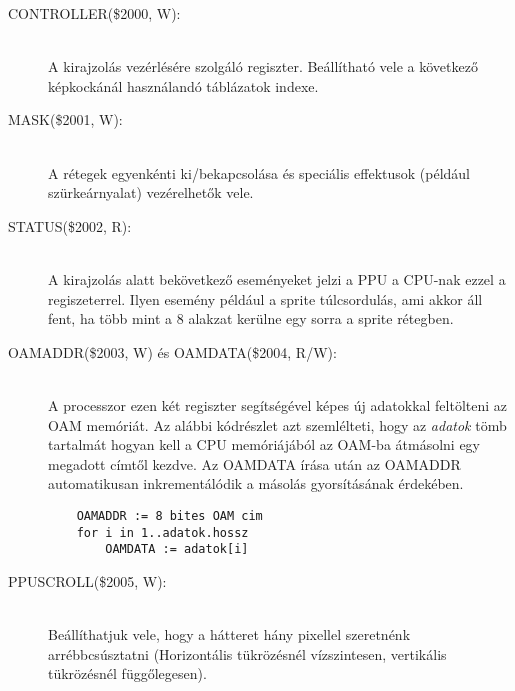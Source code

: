 \begin{description}
	\item[CONTROLLER(\$2000, W):] \hfill \\
	A kirajzolás vezérlésére szolgáló regiszter.
	Beállítható vele a következő képkockánál használandó táblázatok indexe.
	\item[MASK(\$2001, W):] \hfill \\
	A rétegek egyenkénti ki/bekapcsolása és speciális effektusok 
	(például szürkeárnyalat) vezérelhetők vele.
	\item[STATUS(\$2002, R):] \hfill \\
	A kirajzolás alatt bekövetkező eseményeket jelzi a PPU a CPU-nak ezzel a regiszeterrel.
	Ilyen esemény például a sprite túlcsordulás, ami akkor áll fent, ha több mint a 8 alakzat kerülne egy sorra a sprite rétegben. 
	\item[OAMADDR(\$2003, W) és OAMDATA(\$2004, R/W):] \hfill \\
	A processzor ezen két regiszter segítségével képes új adatokkal feltölteni az OAM memóriát.
	Az alábbi kódrészlet azt szemlélteti, hogy az \emph{adatok} tömb tartalmát hogyan kell a CPU memóriájából
	az OAM-ba átmásolni egy megadott címtől kezdve. Az OAMDATA írása után az OAMADDR automatikusan inkrementálódik a másolás gyorsításának érdekében.
	\begin{lstlisting}
	OAMADDR := 8 bites OAM cim
	for i in 1..adatok.hossz
		OAMDATA := adatok[i]
	\end{lstlisting}
	\item[PPUSCROLL(\$2005, W):] \hfill \\
	Beállíthatjuk vele, hogy a hátteret hány pixellel szeretnénk arrébbcsúsztatni (Horizontális tükrözésnél vízszintesen, vertikális tükrözésnél függőlegesen).

\end{description}
